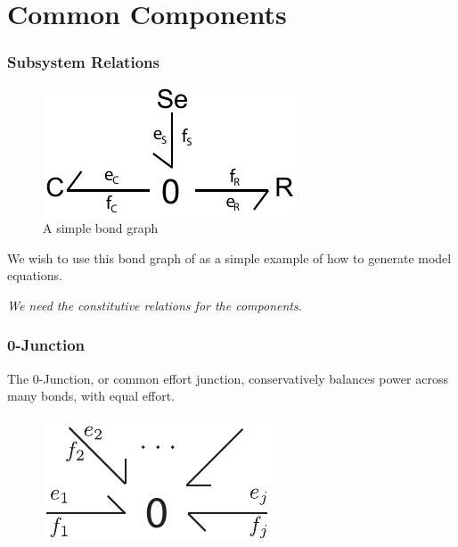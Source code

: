 \section{Common Components}
\begin{frame}
\frametitle{Subsystem Relations}
\begin{figure}
\includegraphics{RC_bondgraph.pdf}
\caption{A simple bond graph}
\end{figure}
We wish to use this bond graph of as a simple example of how to generate model equations.
\vspace{10pt}

\begin{center}
\emph{We need the constitutive relations for the components}.
\end{center}

\begin{figure}
\end{figure}
\end{frame}
\begin{frame}
\frametitle{0-Junction}
The 0-Junction, or common effort junction, conservatively balances power across many bonds, with equal effort.
\begin{figure}
\includegraphics{nport-0.pdf}
\end{figure}
\end{frame}
